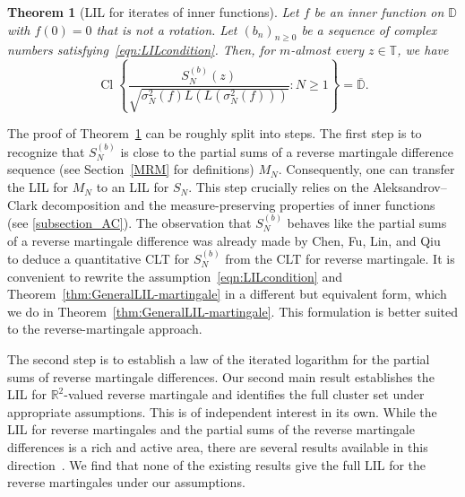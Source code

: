 \documentclass[12pt, reqno, final, a4paper]{amsart}
\theoremstyle{plain}
\newtheorem{theorem}{Theorem}[section]
\theoremstyle{definition}
\theoremstyle{remark}
\DeclareMathOperator{\Cl}{Cl}
\newcommand{\T}{\mathbb T}
\newcommand{\1}{\mathbf 1}
\begin{document}
\begin{theorem}[LIL for iterates of inner functions]
\label{thm:GeneralLIL}
Let $f$ be an inner function on $\mathbb D$ with $f(0)=0$ that is not a rotation. Let $(b_n)_{n\geq 0}$ be a sequence of complex numbers satisfying~\eqref{eqn:LILcondition}. Then, for $m$-almost every $z\in \T$, we have 
\[
\Cl\left\{
 \frac{S_N^{(b)}(z)}{\sqrt{\sigma_N^2(f)L(L(\sigma_N^2(f)))}} : N\ge 1 \right\} =\overline{\mathbb{D}}.
\]
\end{theorem}


The proof of Theorem~\ref{thm:GeneralLIL} can be roughly split into steps. The first step is to recognize that $S_N^{(b)}$ is close to the partial sums of a reverse martingale difference sequence (see Section~\ref{MRM} for definitions) $M_N$. Consequently, one can transfer the LIL for $M_N$ to an LIL for $S_N$. This step crucially relies on the Aleksandrov--Clark decomposition and the measure-preserving properties of inner functions (see \cref{subsection_AC}). The observation that $S_N^{(b)}$ behaves like the partial sums of a reverse martingale difference was already made by Chen, Fu, Lin, and Qiu~\cite{ChenFuLinQiu2026} to deduce a quantitative CLT for $S_N^{(b)}$ from the CLT for reverse martingale. It is convenient to rewrite the assumption~\eqref{eqn:LILcondition} and Theorem~\ref{thm:GeneralLIL-martingale} in a different but equivalent form, which we do in Theorem~\ref{thm:GeneralLIL-martingale}. This formulation is better suited to the reverse-martingale approach.

 
The second step is to establish a law of the iterated logarithm for the partial sums of reverse martingale differences. Our second main result establishes the LIL for $\mathbb{R}^2$-valued reverse martingale and identifies the full cluster set under appropriate assumptions. This is of independent interest in its own. While the LIL for reverse martingales and the partial sums of the reverse martingale differences is a rich and active area, there are several results available in this direction~\cite{ScottHuggins1983, Cuny2015, CunyMerlevede2015}. We find that none of the existing results give the full LIL for the reverse martingales under our assumptions. 
\end{document}
